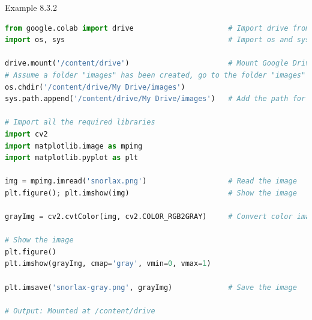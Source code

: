 \documentclass{book}
\begin{document}
\newpage
\begin{egBox}{Example 8.3.2}{}
    \begin{lstlisting}[language=Python, basicstyle=\ttfamily\small, keywordstyle=\color{blue}, commentstyle=\color{forestgreen}, stringstyle=\color{red}, showstringspaces=false]
from google.colab import drive                      # Import drive from google.colab package
import os, sys                                      # Import os and sys modules

drive.mount('/content/drive')                       # Mount Google Drive
# Assume a folder "images" has been created, go to the folder "images"
os.chdir('/content/drive/My Drive/images')
sys.path.append('/content/drive/My Drive/images')   # Add the path for interpreter to search

# Import all the required libraries
import cv2
import matplotlib.image as mpimg
import matplotlib.pyplot as plt

img = mpimg.imread('snorlax.png')                   # Read the image
plt.figure(); plt.imshow(img)                       # Show the image

grayImg = cv2.cvtColor(img, cv2.COLOR_RGB2GRAY)     # Convert color image to gray

# Show the image
plt.figure()
plt.imshow(grayImg, cmap='gray', vmin=0, vmax=1)

plt.imsave('snorlax-gray.png', grayImg)             # Save the image

# Output: Mounted at /content/drive
    \end{lstlisting}    
    \begin{center}
\end{center}
\end{egBox}
\end{document}
